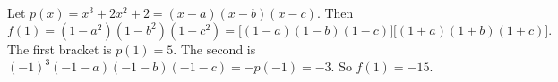 Let $p(x)=x^3+2x^2+2=(x-a)(x-b)(x-c)$. Then
\[f(1)=(1-a^2)(1-b^2)(1-c^2)=\bigl[(1-a)(1-b)(1-c)\bigr]\bigl[(1+a)(1+b)(1+c)\bigr].\]
The first bracket is $p(1)=5$. The second is $(-1)^3(-1-a)(-1-b)(-1-c)=-p(-1)=-3$. So $f(1)=\boxed{-15}$.
